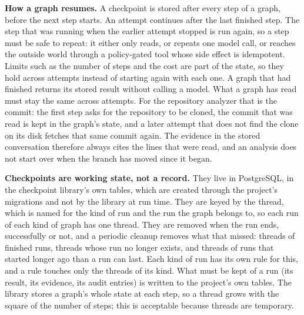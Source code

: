 \documentclass[11pt,a4paper]{article}
\begin{document}
\textbf{How a graph resumes.} A checkpoint is stored after every step of a graph, before the next step starts. An attempt continues after the last finished step. The step that was running when the earlier attempt stopped is run again, so a step must be safe to repeat: it either only reads, or repeats one model call, or reaches the outside world through a policy-gated tool whose side effect is idempotent. Limits such as the number of steps and the cost are part of the state, so they hold across attempts instead of starting again with each one. A graph that had finished returns its stored result without calling a model. What a graph has read must stay the same across attempts. For the repository analyzer that is the commit: the first step asks for the repository to be cloned, the commit that was read is kept in the graph's state, and a later attempt that does not find the clone on its disk fetches that same commit again. The evidence in the stored conversation therefore always cites the lines that were read, and an analysis does not start over when the branch has moved since it began.

\textbf{Checkpoints are working state, not a record.} They live in PostgreSQL, in the checkpoint library's own tables, which are created through the project's migrations and not by the library at run time. They are keyed by the thread, which is named for the kind of run and the run the graph belongs to, so each run of each kind of graph has one thread. They are removed when the run ends, successfully or not, and a periodic cleanup removes what that missed: threads of finished runs, threads whose run no longer exists, and threads of runs that started longer ago than a run can last. Each kind of run has its own rule for this, and a rule touches only the threads of its kind. What must be kept of a run (its result, its evidence, its audit entries) is written to the project's own tables. The library stores a graph's whole state at each step, so a thread grows with the square of the number of steps; this is acceptable because threads are temporary.
\end{document}
